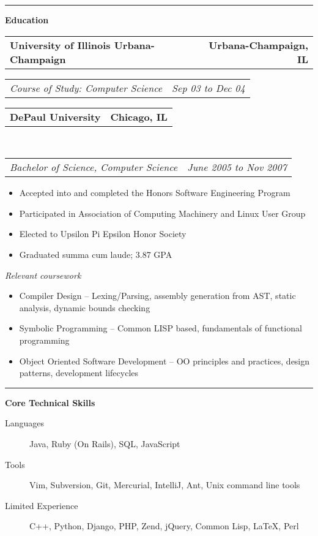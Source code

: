\documentclass[10pt,letterpaper]{article}
\makeatletter
\newcommand{\headerrow}[2]
{\begin{tabular*}{\linewidth}{l@{\extracolsep{\fill}}r}
	#1 &
	#2 \\
\end{tabular*}}
\newenvironment{indentsection}[1]%
{\begin{list}{}%
	{\setlength{\leftmargin}{#1}}%
	\item[]%
}
{\end{list}}
\makeatother
\begin{document}
\vspace{0.1in}
\hrule
\vspace{0.2in}
{\large \textbf{Education}}
\begin{indentsection}{\parindent}
  \headerrow
		{\textbf{University of Illinois Urbana-Champaign}}
		{\textbf{Urbana-Champaign, IL}}
\vspace{0.1in}
  \headerrow
		{\emph{Course of Study: Computer Science}}
		{\emph{Sep 03 to Dec 04}}
	\headerrow
		{\textbf{DePaul University}}
		{\textbf{Chicago, IL}} 
	\\
	\headerrow
		{\emph{Bachelor of Science, Computer Science}} 
		{\emph{June 2005 to Nov 2007}}
	\begin{itemize}
	\renewcommand{\labelitemi}{$-$}
		\vspace{-0.1in}
		\item Accepted into and completed the Honors Software Engineering Program
		\item Participated in Association of Computing Machinery and Linux User Group 
		\item Elected to Upsilon Pi Epsilon Honor Society
		\item Graduated summa cum laude; 3.87 GPA
	\end{itemize}
	{\emph{Relevant coursework}}
	\begin{itemize}
	\renewcommand{\labelitemi}{$-$}
	\vspace{-0.1in}
		\item Compiler Design -- Lexing/Parsing, assembly generation from AST, static analysis, dynamic bounds checking
		\item Symbolic Programming -- Common LISP based, fundamentals of functional programming
		\item Object Oriented Software Development -- OO principles and practices, design patterns, development lifecycles
	\end{itemize}
\end{indentsection}
\vspace{0.1in}
\hrule
\vspace{0.2in}
{\large \textbf{Core Technical Skills}}
\begin{indentsection}{\parindent}
\begin{description}
	\item[Languages]
	Java, Ruby (On Rails), SQL, JavaScript
	\item[Tools]
	Vim, Subversion, Git, Mercurial, IntelliJ, Ant, Unix command line tools
	\item[Limited Experience]
	C++, Python, Django, PHP, Zend, jQuery, Common Lisp, \LaTeX, Perl
\end{description}
\end{indentsection}
\end{document}
